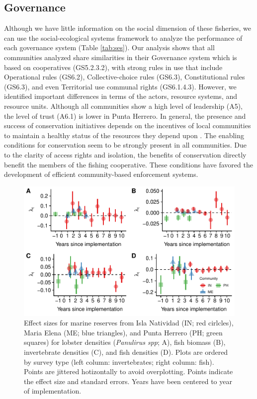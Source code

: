 \documentclass{frontiersSCNS}
\theoremstyle{definition}
\theoremstyle{definition}
\theoremstyle{definition}
\theoremstyle{remark}
\begin{document}
\subsection{Governance}\label{governance}

Although we have little information on the social dimension of these
fisheries, we can use the social-ecological systems framework to analyze
the performance of each governance system (Table \ref{tab:ses}). Our
analysis shows that all communities analyzed share similarities in their
Governance system which is based on cooperatives (GS5.2.3.2), with
strong rules in use that include Operational rules (GS6.2),
Collective-choice rules (GS6.3), Constitutional rules (GS6.3), and even
Territorial use communal rights (GS6.1.4.3). However, we identified
important differences in terms of the actors, resource systems, and
resource units. Although all communities show a high level of leadership
(A5), the level of trust (A6.1) is lower in Punta Herrero. In general,
the presence and success of conservation initiatives depends on the
incentives of local communities to maintain a healthy status of the
resources they depend upon \citep{jupiter_2017}. The enabling conditions
for conservation seem to be strongly present in all communities. Due to
the clarity of access rights and isolation, the benefits of conservation
directly benefit the members of the fishing cooperative. These
conditions have favored the development of efficient community-based
enforcement systems.

\clearpage

\begin{figure}
\centering
\includegraphics{Villasenor-Derbez_files/figure-latex/unnamed-chunk-4-1.pdf}
\caption{\label{fig:unnamed-chunk-4}\label{fig:indicators}Effect sizes for
marine reserves from Isla Natividad (IN; red cirlcles), Maria Elena (ME;
blue triangles), and Punta Herrero (PH; green squares) for lobster
densities (\emph{Panulirus spp}; A), fish biomass (B), invertebrate
densities (C), and fish densities (D). Plots are ordered by survey type
(left column: invertebrates; right column: fish). Points are jittered
hotizontally to avoid overplotting. Points indicate the effect size and
standard errors. Years have been centered to year of implementation.}
\end{figure}
\end{document}
